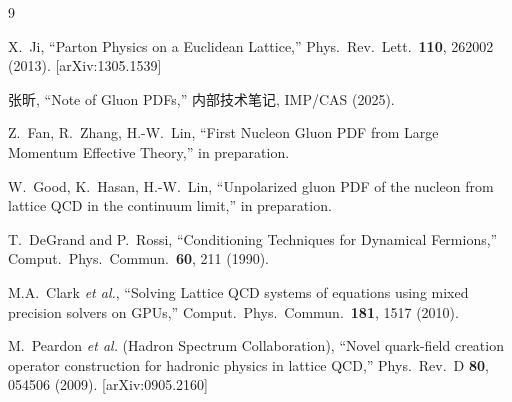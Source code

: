 \documentclass[11pt,a4paper]{article}
\begin{document}
\begin{thebibliography}{9}

X.~Ji,
``Parton Physics on a Euclidean Lattice,''
Phys.\ Rev.\ Lett.\ \textbf{110}, 262002 (2013).
[arXiv:1305.1539]

张昕,
``Note of Gluon PDFs,''
内部技术笔记, IMP/CAS (2025).

Z.~Fan, R.~Zhang, H.-W.~Lin,
``First Nucleon Gluon PDF from Large Momentum Effective Theory,''
in preparation.

W.~Good, K.~Hasan, H.-W.~Lin,
``Unpolarized gluon PDF of the nucleon from lattice QCD in the continuum limit,''
in preparation.

T.~DeGrand and P.~Rossi,
``Conditioning Techniques for Dynamical Fermions,''
Comput.\ Phys.\ Commun.\ \textbf{60}, 211 (1990).

M.A.~Clark \textit{et al.},
``Solving Lattice QCD systems of equations using mixed precision solvers on GPUs,''
Comput.\ Phys.\ Commun.\ \textbf{181}, 1517 (2010).

M.~Peardon \textit{et al.} (Hadron Spectrum Collaboration),
``Novel quark-field creation operator construction for hadronic physics in lattice QCD,''
Phys.\ Rev.\ D \textbf{80}, 054506 (2009).
[arXiv:0905.2160]

\end{thebibliography}
\end{document}
